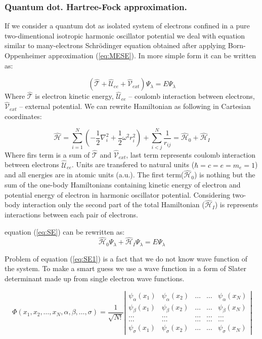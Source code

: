 \documentclass[10pt]{article}
\newcommand*{\hatH}{\hat{\mathcal{H}}}
\newcommand*{\hatT}{\hat{\mathcal{T}}}
\newcommand*{\hatU}{\hat{\mathcal{U}}}
\newcommand*{\hatV}{\hat{\mathcal{V}}}
\begin{document}
\subsubsection{Quantum dot. Hartree-Fock approximation.} 
If we consider a quantum dot as isolated system of electrons confined in a pure two-dimentional isotropic harmonic oscillator potential we deal with equation similar to many-electrons Schr\"{o}dinger equation obtained after applying Born-Oppenheimer approximation (\ref{eq:MESE}).
In more simple form it can be written as:

\begin{equation}\label{eq:SE}
(\hatT + \hatU_{ee} + \hatV_{ext}) \Psi_{\lambda} = E \Psi_{\lambda}
\end{equation}
Where $\hatT$ is electron kinetic energy, $\hatU_{ee}$ -- coulomb interaction between electrons, $\hatV_{ext}$ -- external potential. We can rewrite Hamiltonian as following in Cartesian coordinates:

\[
\hatH = \sum_{i=1}^{N} \left(  -\frac{1}{2} \nabla_i^2 + \frac{1}{2} \omega^2r_i^2  \right)+\sum_{i<j}^{N}\frac{1}{r_{ij}} = \hatH_0 + \hatH_I
\]
Where firs term is a sum of $\hatT$ and $\hatV_{ext}$, last term represents coulomb interaction between electrons $\hatU_{ee}$. Units are transfered to natural units ($\hbar=c=e=m_e=1$) and all energies are in atomic units (a.u.). The first term($\hatH_0$) is nothing but the sum of the one-body Hamiltonians containing kinetic energy of electron and potential energy of electron in harmonic oscillator potential. Considering two-body interaction only the second part of the total Hamiltonian ($\hatH_I$) is represents interactions between each pair of electrons.

equation (\ref{eq:SE}) can be rewritten as: 
\begin{equation}\label{eq:SE1}
\hatH_0 \Psi_{\lambda} + \hatH_I \Psi_{\lambda} = E \Psi_{\lambda}
\end{equation}

Problem of equation (\ref{eq:SE1}) is a fact that we do not know wave function of the system. To make a smart guess we use a wave function in a form of Slater determinant made up from single electron wave functions. 

\begin{equation}
\Phi(x_1, x_2,\dots ,x_N,\alpha,\beta,\dots, \sigma)=\frac{1}{\sqrt{N!}}
\left| \begin{array}{ccccc} \psi_{\alpha}(x_1)& \psi_{\alpha}(x_2)& \dots & \dots & \psi_{\alpha}(x_N)\\
                            \psi_{\beta}(x_1)&\psi_{\beta}(x_2)& \dots & \dots & \psi_{\beta}(x_N)\\  
                            \dots & \dots & \dots & \dots & \dots \\
                            \dots & \dots & \dots & \dots & \dots \\
                     \psi_{\sigma}(x_1)&\psi_{\sigma}(x_2)& \dots & \dots & \psi_{\sigma}(x_N)\end{array} \right| \label{eq:HartreeFockDet}
\end{equation}
\end{document}
